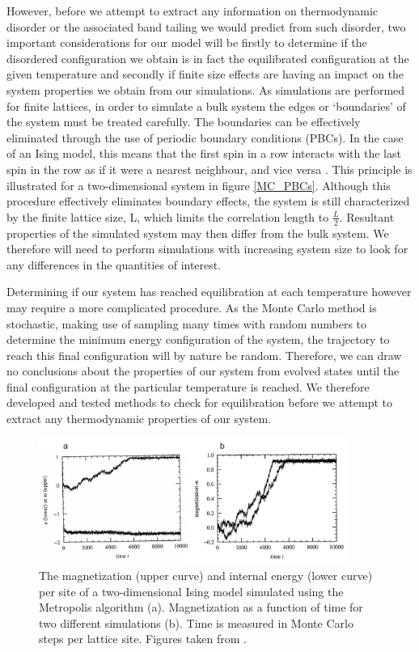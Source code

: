\documentclass[11pt, twoside]{report}
\begin{document}
However, before we attempt to extract any information on thermodynamic disorder or the associated band tailing we would predict from such disorder, two important considerations for our model will be firstly to determine if the disordered configuration we obtain is in fact the equilibrated configuration at the given temperature and secondly if finite size effects are having an impact on the system properties we obtain from our simulations.
As simulations are performed for finite lattices, in order to simulate a bulk system the edges or `boundaries' of the system must be treated carefully. The boundaries can be effectively eliminated through the use of periodic boundary conditions (PBCs). In the case of an Ising model, this means that the first spin in a row interacts with the last spin in the row as if it were a nearest neighbour, and vice versa \cite{MC_Landau}. This principle is illustrated for a two-dimensional system in figure \ref{MC_PBCs}. Although this procedure effectively eliminates boundary effects, the system is still characterized by the finite lattice size, L, which limits the correlation length to $\frac{L}{2}$. Resultant properties of the simulated system may then differ from the bulk system. We therefore will need to perform simulations with increasing system size to look for any differences in the quantities of interest.

Determining if our system has reached equilibration at each temperature however may require a more complicated procedure. As the Monte Carlo method is stochastic, making use of sampling many times with random numbers to determine the minimum energy configuration of the system, the trajectory to reach this final configuration will by nature be random. Therefore, we can draw no conclusions about the properties of our system from evolved states until the final configuration at the particular temperature is reached. We therefore developed and tested methods to check for equilibration before we attempt to extract any thermodynamic properties of our system.

\begin{figure}[h!]
  \centering
    \includegraphics[width=0.9\textwidth]{figures/ising_equil.png}
    \caption{The magnetization (upper curve) and internal energy (lower curve) per site of a two-dimensional Ising model simulated using the Metropolis algorithm (a). Magnetization as a function of time for two different simulations (b). Time is measured in Monte Carlo steps per lattice site. Figures taken from .}
  \label{ising_equil}
\end{figure}
\end{document}
